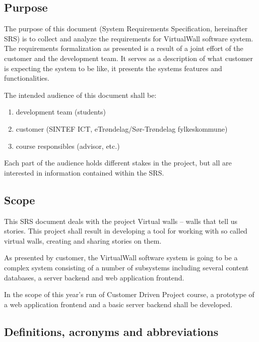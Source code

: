 \documentclass[11pt]{book}
\begin{document}
\subsection{Purpose}
The purpose of this document (System Requirements Specification, hereinafter SRS) is to collect and analyze the requirements for VirtualWall software system. The requirements formalization as presented is a result of a joint effort of the customer and the development team. It serves as a description of what customer is expecting the system to be like, it presents the systems features and functionalities.

The intended audience of this document shall be:

\begin{enumerate}
  \item development team (students)
  \item customer (SINTEF ICT, eTrøndelag/Sør-Trøndelag fylkeskommune)
  \item course responsibles (advisor, etc.)
\end{enumerate}

Each part of the audience holds different stakes in the project, but all are interested in information contained within the SRS.

\subsection{Scope}
This SRS document deals with the project Virtual walls – walls that tell us stories. This project shall result in developing a tool for working with so called virtual walls, creating and sharing stories on them.

As presented by customer, the VirtualWall software system is going to be a complex system consisting of a number of subsystems including several content databases, a server backend and web application frontend.

In the scope of this year's run of Customer Driven Project course, a prototype of a web application frontend and a basic server backend shall be developed.

\subsection{Definitions, acronyms and abbreviations}
\end{document}
